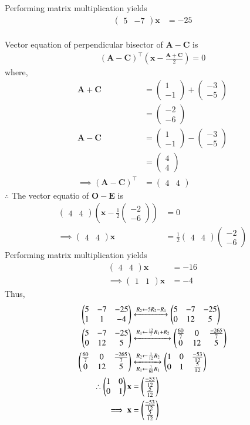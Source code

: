 \documentclass[journal,12pt,twocolumn]{IEEEtran}
\theoremstyle{remark}
\newcommand{\myvec}[1]{\ensuremath{\begin{pmatrix}#1\end{pmatrix}}}
\providecommand{\brak}[1]{\ensuremath{\left(#1\right)}}
\let\vec\mathbf
\begin{document}
Performing matrix multiplication yields
\begin{align}
\myvec{5&-7}\vec{x}&=-25
\end{align}\\
Vector equation of perpendicular bisector of $\vec{A}-\vec{C}$ is
\begin{align}
(\vec{A}-\vec{C})^\top\brak{ \vec{x} - \frac{\vec{A}+\vec{C}}{2}} = 0
\end{align}
where,
\begin{align}
\vec{A}+\vec{C}&=\myvec{1\\-1}+\myvec{-3\\-5}\\
&=\myvec{-2\\-6}\\
\vec{A}-\vec{C} &= \myvec{1\\-1}-\myvec{-3\\-5}\\
&=\myvec{4\\4}\\
\implies (\vec{A}-\vec{C})^\top &= \myvec{4&4}
\end{align}
$\therefore $ The vector equatio of $\vec{O}-\vec{E}$ is
\begin{align}
\myvec{4&4}\brak{ \vec{x}-\frac{1}{2}\myvec{-2\\-6}}&=0\\
\implies \myvec{4&4}\vec{x}&=\frac{1}{2}\myvec{4&4}\myvec{-2\\-6}
\end{align}
Performing matrix multiplication yields
\begin{align}
\myvec{4&4}\vec{x}&=-16\\
\implies \myvec{1&1}\vec{x}&=-4
\end{align}
Thus,
\begin{align}
\myvec{5&-7&-25\\1&1&-4} &\xleftrightarrow[]{R_2 \leftarrow 5R_2 - R_1} \myvec{5&-7&-25\\0&12&5}\\
\myvec{5&-7&-25\\0&12&5} &\xleftrightarrow[]{R_1\leftarrow \frac{12}{7}R_1 + R_2} \myvec{\frac{60}{7}&0& \frac{-265}{7}\\0&12&5}\\
\myvec{\frac{60}{7}&0& \frac{-265}{7}\\0&12&5} &\xleftrightarrow[R_1\leftarrow \frac{7}{60}R_1]{R_2 \leftarrow \frac{1}{12}R_2} \myvec{1&0& \frac{-53}{12}\\0&1&\frac{5}{12}}\\
\therefore \myvec{1&0\\0&1}\vec{x} &= \myvec{\frac{-53}{12}\\\frac{5}{12}}\\
\implies \vec{x}&=\myvec{\frac{-53}{12}\\\frac{5}{12}}
\end{align}
\end{document}
